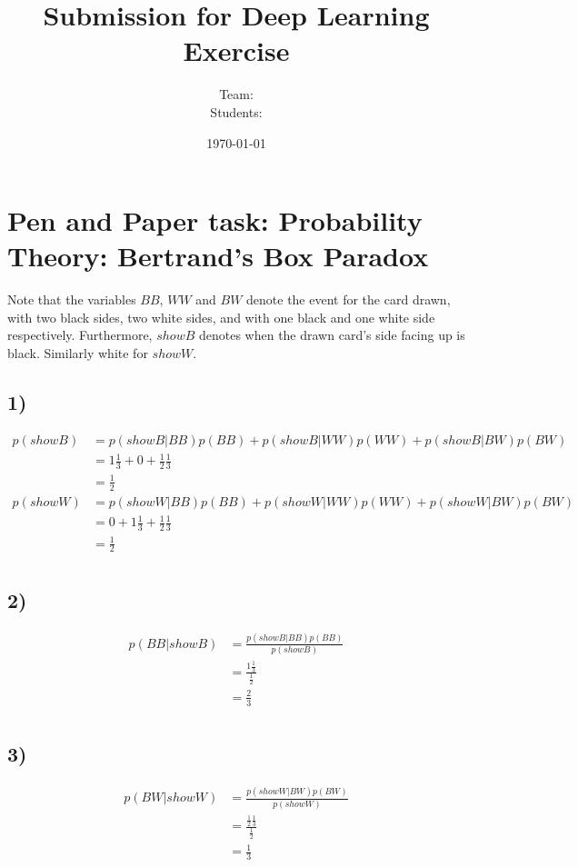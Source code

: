 \documentclass[addpoints]{exam}
\title{Submission for Deep Learning Exercise \assignmentnumber}
\author{Team: \teamname\\Students: \students}
\date{\today}
\begin{document}
    \maketitle


    \section*{Pen and Paper task: Probability Theory: Bertrand’s Box Paradox}
    Note that the variables $BB$, $WW$ and $BW$ denote the event for the card drawn, with two black sides, two white sides, and with one black and one white side respectively. Furthermore, $show B$ denotes when the drawn card's side facing up is black. Similarly white for $show W$.
    \subsection*{1)}
    \begin{align*}
        p(show B) &= p(show B|BB)p(BB) + p(show B|WW)p(WW) + p(show B|BW)p(BW)\\
        &= 1\frac{1}{3} + 0 + \frac{1}{2}\frac{1}{3}\\
        &= \frac{1}{2}\\
        p(show W) &= p(show W|BB)p(BB) + p(show W|WW)p(WW) + p(show W|BW)p(BW)\\
        &= 0 + 1\frac{1}{3} + \frac{1}{2}\frac{1}{3}\\
        &= \frac{1}{2}\\
    \end{align*}
    \subsection*{2)}
    \begin{align*}
        p(BB|show B) &= \frac{p(show B| BB)p(BB)}{p(show B)}\\
        &= \frac{1\frac{1}{3}}{\frac{1}{2}}\\
        &= \frac{2}{3}\\
    \end{align*}
    \subsection*{3)}
    \begin{align*}
        p(BW|show W) &= \frac{p(show W| BW)p(BW)}{p(show W)}\\
        &= \frac{\frac{1}{2}\frac{1}{3}}{\frac{1}{2}}\\
        &= \frac{1}{3}\\
    \end{align*}
\end{document}
